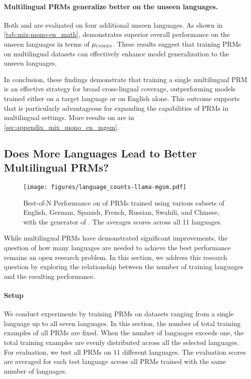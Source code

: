 \paragraph{Multilingual PRMs generalize better on the unseen languages.}
Both \en and \mix are evaluated on four additional unseen languages. As shown in \autoref{tab:mix-mono-en_math}, \mix demonstrates superior overall performance on the unseen languages in terms of $\mu_{\textsc{unseen}}$. These results suggest that training PRMs on multilingual datasets can effectively enhance model generalization to the unseen languages.


In conclusion, these findings demonstrate that training a single multilingual PRM is an effective strategy for broad cross-lingual coverage, outperforming models trained either on a target language or on English alone. This outcome supports that \mix is particularly advantageous for expanding the capabilities of PRMs in multilingual settings. More results on \mgsmset are in \autoref{sec:appendix_mix_mono_en_mgsm}.








\subsection{Does More Languages Lead to Better Multilingual PRMs?}
\label{sec:results_languages_number}

\begin{figure}[t]
    \centering
    \texttt{[image: figures/language\_counts-llama-mgsm.pdf]}
    \caption{Best-of-N Performance on \mgsmset of PRMs trained using various subsets of English, German, Spanish, French, Russian, Swahili, and Chinese, with the generator of \llama. The averages scores across all 11 languages.}
    \label{fig:train-counts}
\end{figure}


While multilingual PRMs have demonstrated significant improvements, the question of how many languages are needed to achieve the best performance remains an open research problem. In this section, we address this research question by exploring the relationship between the number of training languages and the resulting performance.


\paragraph{Setup}
We conduct experiments by training PRMs on datasets ranging from a single language up to all seven languages. 
In this section, the number of total training examples of all PRMs are fixed.
When the number of languages exceeds one, the total training examples are evenly distributed across all the selected languages. For evaluation, we test all PRMs on 11 different languages. The evaluation scores are averaged for each test language across all PRMs trained with the same number of languages.




